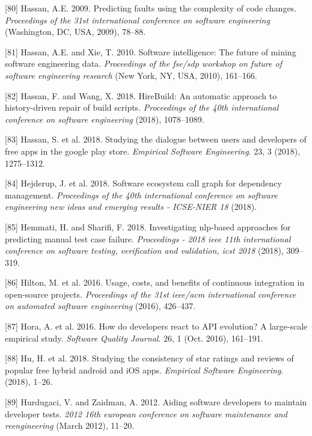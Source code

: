 \documentclass[]{book}
\begin{document}
\hypertarget{ref-hassan2009}{}
{[}80{]} Hassan, A.E. 2009. Predicting faults using the complexity of
code changes. \emph{Proceedings of the 31st international conference on
software engineering} (Washington, DC, USA, 2009), 78--88.

\hypertarget{ref-Hassa10}{}
{[}81{]} Hassan, A.E. and Xie, T. 2010. Software intelligence: The
future of mining software engineering data. \emph{Proceedings of the
fse/sdp workshop on future of software engineering research} (New York,
NY, USA, 2010), 161--166.

\hypertarget{ref-hassan2018hirebuild}{}
{[}82{]} Hassan, F. and Wang, X. 2018. HireBuild: An automatic approach
to history-driven repair of build scripts. \emph{Proceedings of the 40th
international conference on software engineering} (2018), 1078--1089.

\hypertarget{ref-hassan2018studying}{}
{[}83{]} Hassan, S. et al. 2018. Studying the dialogue between users and
developers of free apps in the google play store. \emph{Empirical
Software Engineering}. 23, 3 (2018), 1275--1312.

\hypertarget{ref-Hejderup2018}{}
{[}84{]} Hejderup, J. et al. 2018. Software ecosystem call graph for
dependency management. \emph{Proceedings of the 40th international
conference on software engineering new ideas and emerging results -
ICSE-NIER 18} (2018).

\hypertarget{ref-hemmati2018}{}
{[}85{]} Hemmati, H. and Sharifi, F. 2018. Investigating nlp-based
approaches for predicting manual test case failure. \emph{Proceedings -
2018 ieee 11th international conference on software testing,
verification and validation, icst 2018} (2018), 309--319.

\hypertarget{ref-hilton2016usage}{}
{[}86{]} Hilton, M. et al. 2016. Usage, costs, and benefits of
continuous integration in open-source projects. \emph{Proceedings of the
31st ieee/acm international conference on automated software
engineering} (2016), 426--437.

\hypertarget{ref-Hora2016}{}
{[}87{]} Hora, A. et al. 2016. How do developers react to API evolution?
A large-scale empirical study. \emph{Software Quality Journal}. 26, 1
(Oct. 2016), 161--191.

\hypertarget{ref-hu2018studying}{}
{[}88{]} Hu, H. et al. 2018. Studying the consistency of star ratings
and reviews of popular free hybrid android and iOS apps. \emph{Empirical
Software Engineering}. (2018), 1--26.

\hypertarget{ref-hurdugaci2012}{}
{[}89{]} Hurdugaci, V. and Zaidman, A. 2012. Aiding software developers
to maintain developer tests. \emph{2012 16th european conference on
software maintenance and reengineering} (March 2012), 11--20.
\end{document}
